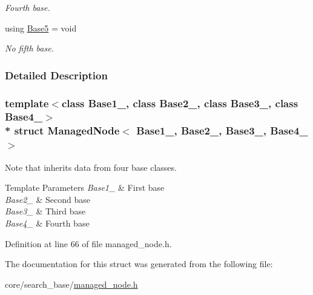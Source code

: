 \begin{DoxyCompactItemize}
\begin{DoxyCompactList}\small\item\em Fourth base. \end{DoxyCompactList}\item 
using \hyperlink{structManagedNode_3_01Base1___00_01Base2___00_01Base3___00_01Base4___01_4_ace1276b4a1517a4f08444540d257e570}{Base5} = void\hypertarget{structManagedNode_3_01Base1___00_01Base2___00_01Base3___00_01Base4___01_4_ace1276b4a1517a4f08444540d257e570}{}\label{structManagedNode_3_01Base1___00_01Base2___00_01Base3___00_01Base4___01_4_ace1276b4a1517a4f08444540d257e570}

\begin{DoxyCompactList}\small\item\em No fifth base. \end{DoxyCompactList}\end{DoxyCompactItemize}


\subsubsection{Detailed Description}
\subsubsection*{template$<$class Base1\+\_\+, class Base2\+\_\+, class Base3\+\_\+, class Base4\+\_\+$>$\\*
struct Managed\+Node$<$ Base1\+\_\+, Base2\+\_\+, Base3\+\_\+, Base4\+\_\+ $>$}

Note that inherits data from four base classes. 


\begin{DoxyTemplParams}{Template Parameters}
{\em Base1\+\_\+} & First base \\
\hline
{\em Base2\+\_\+} & Second base \\
\hline
{\em Base3\+\_\+} & Third base \\
\hline
{\em Base4\+\_\+} & Fourth base \\
\hline
\end{DoxyTemplParams}


Definition at line 66 of file managed\+\_\+node.\+h.



The documentation for this struct was generated from the following file\+:\begin{DoxyCompactItemize}
\item 
core/search\+\_\+base/\hyperlink{managed__node_8h}{managed\+\_\+node.\+h}\end{DoxyCompactItemize}
